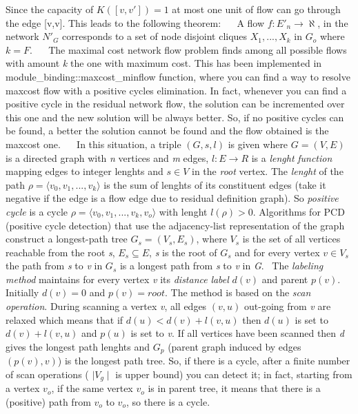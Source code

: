 Since the capacity of $ K([v,v'])=1 $ at most one unit of flow can go through the edge \mbox{[}v,v\textquotesingle{}\mbox{]}. This leads to the following theorem\+:~\newline
~\newline
 A flow $ f:E'_n \rightarrow \aleph $, in the network $ N'_G $ corresponds to a set of node disjoint cliques $ X_1,...,X_k $ in $ G_o $ where $ k=F $.~\newline
~\newline
 The maximal cost network flow problem finds among all possible flows with amount {\itshape k} the one with maximum cost. This has been implemented in module\+\_\+binding\+::maxcost\+\_\+minflow function, where you can find a way to resolve maxcost flow with a positive cycles elimination. In fact, whenever you can find a positive cycle in the residual network flow, the solution can be incremented over this one and the new solution will be always better. So, if no positive cycles can be found, a better the solution cannot be found and the flow obtained is the maxcost one.~\newline
~\newline
 In this situation, a triple $ (G,s,l) $ is given where $ G=(V,E) $ is a directed graph with {\itshape n} vertices and {\itshape m} edges, $ l:E \rightarrow R $ is a {\itshape lenght} {\itshape function} mapping edges to integer lenghts and $ s \in V $ in the {\itshape root} vertex. The {\itshape lenght} of the path $ \rho = \langle v_0,v_1,...,v_k \rangle $ is the sum of lenghts of its constituent edges (take it negative if the edge is a flow edge due to residual definition graph). So {\itshape positive} {\itshape cycle} is a cycle $ \rho = \langle v_0,v_1,...,v_k,v_o \rangle $ with lenght $ l(\rho )>0 $. Algorithms for P\+CD (positive cycle detection) that use the adjacency-\/list representation of the graph construct a longest-\/path tree $ G_s=(V_s,E_s) $, where $ V_s $ is the set of all vertices reachable from the root {\itshape s}, $ E_s \subseteq E $, {\itshape s} is the root of $ G_s $ and for every vertex $ v \in V_s $ the path from {\itshape s} to {\itshape v} in $ G_s $ is a longest path from {\itshape s} to {\itshape v} in {\itshape G}.~\newline
 The {\itshape labeling} {\itshape method} maintains for every vertex {\itshape v} its {\itshape distance} {\itshape label} $ d(v) $ and parent $ p(v) $. Initially $ d(v)=0 $ and $ p(v)=root $. The method is based on the {\itshape scan} {\itshape operation}. During scanning a vertex {\itshape v}, all edges $ (v,u) $ out-\/going from {\itshape v} are relaxed which means that if $ d(u) < d(v) + l(v,u) $ then $ d(u) $ is set to $ d(v)+l(v,u) $ and $ p(u) $ is set to {\itshape v}. If all vertices have been scanned then {\itshape d} gives the longest path lenghts and $ G_p $ (parent graph induced by edges $ (p(v),v) $) is the longest path tree. So, if there is a cycle, after a finite number of scan operations ( $ \mid V_g \mid $ is upper bound) you can detect it; in fact, starting from a vertex $ v_o $, if the same vertex $ v_o $ is in parent tree, it means that there is a (positive) path from $ v_o $ to $ v_o $, so there is a cycle.~\newline
